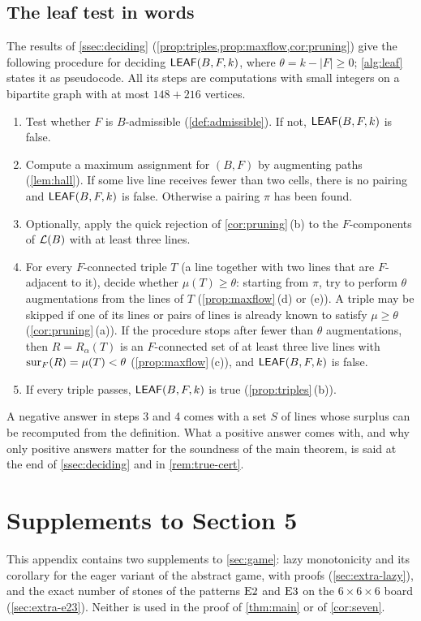 \subsection{The leaf test in words}\label{ssec:supp-leafwords}

The results of \cref{ssec:deciding} (\cref{prop:triples,prop:maxflow,cor:pruning}) give the following procedure for deciding $\mathsf{LEAF}(B,F,k)$, where
$\theta=k-|F|\ge 0$; \cref{alg:leaf} states it as pseudocode. All its steps are computations with small integers on a bipartite graph with at
most $148+216$ vertices.
\begin{enumerate}[label=\textup{\arabic*.}]
\item Test whether $F$ is $B$-admissible (\cref{def:admissible}). If not, $\mathsf{LEAF}(B,F,k)$ is false.
\item Compute a maximum assignment for $(B,F)$ by augmenting paths (\cref{lem:hall}). If some live line
      receives fewer than two cells, there is no pairing and $\mathsf{LEAF}(B,F,k)$ is false. Otherwise a pairing
      $\pi$ has been found.
\item Optionally, apply the quick rejection of \cref{cor:pruning}\,(b) to the $F$-components of
      $\mathcal{L}(B)$ with at least three lines.
\item For every $F$-connected triple $T$ (a line together with two lines that are $F$-adjacent to it),
      decide whether $\mu(T)\ge\theta$: starting from $\pi$, try to perform $\theta$ augmentations from
      the lines of $T$ (\cref{prop:maxflow}\,(d) or (e)). A triple may be skipped if one of its lines or
      pairs of lines is already known to satisfy $\mu\ge\theta$ (\cref{cor:pruning}\,(a)). If the
      procedure stops after fewer than $\theta$ augmentations, then $R=R_\alpha(T)$ is an $F$-connected
      set of at least three live lines with $\operatorname{sur}_F(R)=\mu(T)<\theta$ (\cref{prop:maxflow}\,(c)), and
      $\mathsf{LEAF}(B,F,k)$ is false.
\item If every triple passes, $\mathsf{LEAF}(B,F,k)$ is true (\cref{prop:triples}\,(b)).
\end{enumerate}
A negative answer in steps 3 and 4 comes with a set $S$ of lines whose surplus can be recomputed from
the definition. What a positive answer comes with, and why only positive answers matter for the
soundness of the main theorem, is said at the end of \cref{ssec:deciding} and in \cref{rem:true-cert}.



\section{Supplements to Section 5}\label{sec:extra-game}

This appendix contains two supplements to \cref{sec:game}: lazy monotonicity and its corollary for the
eager variant of the abstract game, with proofs (\cref{sec:extra-lazy}), and the exact number of stones
of the patterns $\mathrm{E2}$ and $\mathrm{E3}$ on the $6\times6\times6$ board (\cref{sec:extra-e23}). Neither is
used in the proof of \cref{thm:main} or of \cref{cor:seven}.


